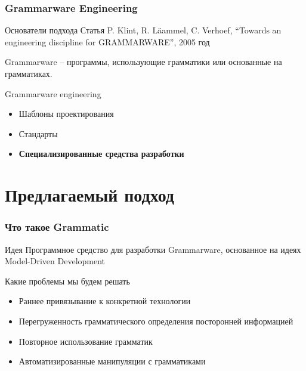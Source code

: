 \documentclass[paper=screen,10pt,unicode]{beamer}
\begin{document}
\begin{frame}
	\frametitle{Grammarware Engineering}

	\begin{block}{Основатели подхода}
		Статья P. Klint, R. L\"{a}ammel, C. Verhoef, ``Towards an engineering discipline for GRAMMARWARE'', 2005 год
	\end{block}
	\begin{definition}
		\alert{Grammarware} -- программы, использующие грамматики или основанные на грамматиках.
	\end{definition}
	\begin{block}{Grammarware engineering}
		\begin{itemize}
			\item Шаблоны проектирования
			\item Стандарты
			\item {\bf Специализированные средства разработки }
		\end{itemize}
	\end{block}
\end{frame}

\section{Предлагаемый подход}
\begin{frame}
	\frametitle{Что такое Grammatic}

	\begin{block}{Идея}
		Программное средство для разработки Grammarware, основанное на идеях Model-Driven Development
	\end{block}
	\begin{block}{Какие проблемы мы будем решать}
		\begin{itemize}
			\item Раннее привязывание к конкретной технологии
			\item Перегруженность грамматического определения посторонней информацией
			\item Повторное использование грамматик
			\item Автоматизированные манипуляции с грамматиками
		\end{itemize}
	\end{block}
\end{frame}
\end{document}
